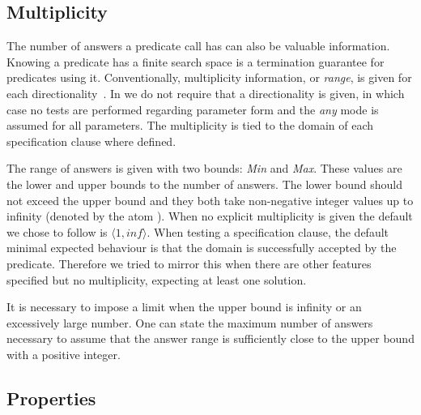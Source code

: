
\subsection{Multiplicity}
The number of answers a predicate call has can also be valuable
information.
%
Knowing a predicate has a finite search space is a termination
guarantee for predicates using it.
%
Conventionally, multiplicity information, or \emph{range}, is given for
each directionality~\cite{}. %
%
In \plqc{} we do not require that a directionality is given, in which
case no tests are performed regarding parameter form and the \emph{any}
mode is assumed for all parameters.
%
The multiplicity is tied to the domain of each specification clause
where defined.


The range of answers is given with two bounds: \emph{Min} and
\emph{Max}.
%
These values are the lower and upper bounds to the number of answers.
%
The lower bound should not exceed the upper bound and they both take
non-negative integer values up to infinity (denoted by the atom
).
%
When no explicit multiplicity is given the default we chose to follow is
$\langle 1, inf \rangle $.
%
When testing a specification clause, the default minimal expected
behaviour is that the domain is successfully accepted by the predicate.
%
Therefore we tried to mirror this when there are other features
specified but no multiplicity, expecting at least one solution.


It is necessary to impose a limit when the upper bound is infinity or an
excessively large number.
%
One can state the maximum number of answers necessary to assume that the
answer range is sufficiently close to the upper bound with a positive
integer.

\subsection{Properties}

